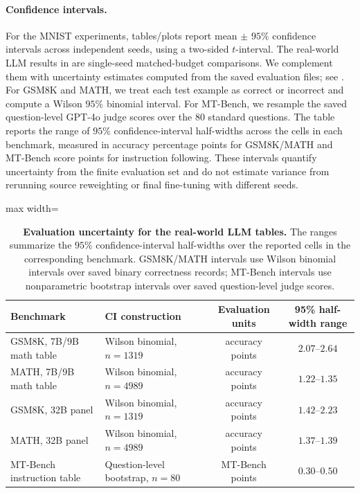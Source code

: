 \documentclass{article}
\theoremstyle{normaltheorem}
\begin{document}
\paragraph{Confidence intervals.}
For the MNIST experiments, tables/plots report mean $\pm$ $95\%$ confidence intervals across independent seeds, using a two-sided $t$-interval.
The real-world LLM results in  are single-seed matched-budget comparisons. We complement them
with uncertainty estimates computed from the saved evaluation files; see . For GSM8K and
MATH, we treat each test example as correct or incorrect and compute a Wilson \(95\%\) binomial interval. For MT-Bench, we
resample the saved question-level GPT-4o judge scores over the \(80\) standard questions. The table reports the range of
\(95\%\) confidence-interval half-widths across the cells in each benchmark, measured in accuracy percentage points for
GSM8K/MATH and MT-Bench score points for instruction following. These intervals quantify uncertainty from the finite
evaluation set and do not estimate variance from rerunning source reweighting or final fine-tuning with different seeds.

\begin{table}[t]
  \centering
  \caption{\textbf{Evaluation uncertainty for the real-world LLM tables.}
  The ranges summarize the \(95\%\) confidence-interval half-widths over the reported cells in the corresponding benchmark. GSM8K/MATH intervals use Wilson binomial intervals over saved binary correctness records; MT-Bench intervals use nonparametric bootstrap intervals over saved question-level judge scores.}
  \label{tab:llm-eval-uncertainty}
  \begin{adjustbox}{max width=\linewidth}
  \begin{tabular}{llcc}
    \toprule
    Benchmark & CI construction & Evaluation units & 95\% half-width range \\
    \midrule
    GSM8K, 7B/9B math table & Wilson binomial, \(n=1319\) & accuracy points & \(2.07\)--\(2.64\) \\
    MATH, 7B/9B math table & Wilson binomial, \(n=4989\) & accuracy points & \(1.22\)--\(1.35\) \\
    GSM8K, 32B panel & Wilson binomial, \(n=1319\) & accuracy points & \(1.42\)--\(2.23\) \\
    MATH, 32B panel & Wilson binomial, \(n=4989\) & accuracy points & \(1.37\)--\(1.39\) \\
    MT-Bench instruction table & Question-level bootstrap, \(n=80\) & MT-Bench points & \(0.30\)--\(0.50\) \\
    \bottomrule
  \end{tabular}
  \end{adjustbox}
\end{table}
\end{document}
